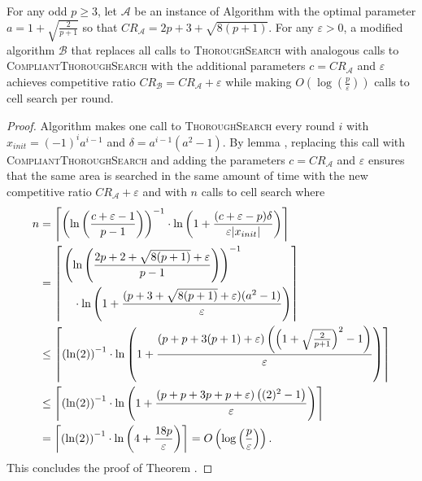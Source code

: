 \begin{theorem} 
    For any odd $p\geq 3$, let $\mathcal{A}$ be an instance of Algorithm  with the optimal parameter $a = 1+\sqrt{\frac{2}{p+1}}$ so that $CR_{\mathcal{A}} = 2p+3+\sqrt{8(p+1)}$. For any $\varepsilon>0$, a modified algorithm $\mathcal{B}$ that replaces all calls to \textsc{ThoroughSearch} with analogous calls to \textsc{CompliantThoroughSearch} with the additional parameters $c=CR_{\mathcal{A}}$ and $\varepsilon$ achieves competitive ratio $CR_{\mathcal{B}} = CR_{\mathcal{A}}+\varepsilon$ while making $O\left(\log\left(\frac{p}{\varepsilon}\right)\right)$ calls to cell search per round.
\end{theorem}
\begin{appendixonly}
\begin{proof}
    Algorithm  makes one call to \textsc{ThoroughSearch} every round $i$ with $x_{init} = (-1)^ia^{i-1}$ and $\delta = a^{i-1}(a^2-1)$. 
    By lemma , replacing this call with \textsc{Compliant\allowbreak Thorough\allowbreak Search} and adding the parameters $c=CR_{\mathcal{A}}$ and $\varepsilon$ ensures that the same area is searched in the same amount of time with the new competitive ratio $CR_{\mathcal{A}}+\varepsilon$ and with $n$ calls to cell search where
    \begin{align*}
        n &= \ceil*{\left(\ln\left(\frac{c+\varepsilon-1}{p-1}\right)\right)^{-1}\cdot\ln\left(1+\frac{(c+\varepsilon-p)\delta}{\varepsilon |x_{init}|}\right)} \\
        &= \ceil*{
            \begin{aligned}
                &\left(\ln\left(\frac{2p+2+\sqrt{8(p+1)}+\varepsilon}{p-1}\right)\right)^{-1} \\
                &\quad \cdot \ln\left(1+\frac{(p+3+\sqrt{8(p+1)}+\varepsilon)(a^2-1)}{\varepsilon}\right)
            \end{aligned}
        } \\
        &\leq \ceil*{\left(\ln(2)\right)^{-1}\cdot\ln\left(1+\frac{(p+p+3(p+1)+\varepsilon)\left(\left(1+\sqrt{\frac{2}{p+1}}\right)^2-1\right)}{\varepsilon}\right)} \\
        &\leq \ceil*{\left(\ln(2)\right)^{-1}\cdot\ln\left(1+\frac{(p+p+3p+p+\varepsilon)\left((2)^2-1\right)}{\varepsilon}\right)} \\
        &= \ceil*{\left(\ln(2)\right)^{-1}\cdot\ln\left(4+\frac{18p}{\varepsilon}\right)}
        = O\left(\log\left(\frac{p}{\varepsilon}\right)\right) .
    \end{align*}
    This concludes the proof of Theorem .
\end{proof}
\end{appendixonly}

